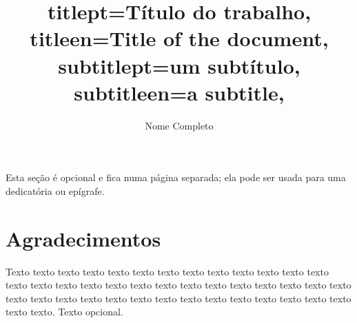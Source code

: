 \documentclass[12pt,twoside,english,brazilian]{book}
\title{
    titlept={Título do trabalho},
    titleen={Title of the document},
    subtitlept={um subtítulo},
    subtitleen={a subtitle},
}
\author[fem]{Nome Completo}
\begin{document}

\frontmatter

\pagestyle{plain}

\onehalfspacing %

\maketitle %


\begin{dedicatoria}
Esta seção é opcional e fica numa página separada; ela pode ser usada para
uma dedicatória ou epígrafe.
\end{dedicatoria}


\chapter*{Agradecimentos}

Texto texto texto texto texto texto texto texto texto texto texto texto texto
texto texto texto texto texto texto texto texto texto texto texto texto texto
texto texto texto texto texto texto texto texto texto texto texto texto texto
texto texto texto texto. Texto opcional.




\end{document}
